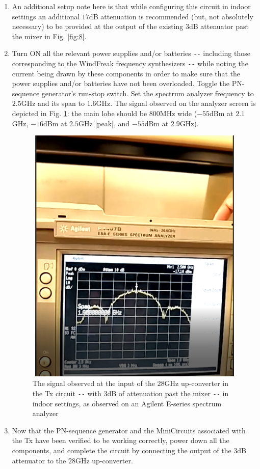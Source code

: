 \documentclass[12pt, draftcls, onecolumn]{IEEEtran}
\begin{document}
\begin{enumerate}
    \item An additional setup note here is that while configuring this circuit in indoor settings an additional $17$dB attenuation is recommended (but, not absolutely necessary) to be provided at the output of the existing $3$dB attenuator past the mixer in Fig. \ref{fig:8}.
    \item Turn ON all the relevant power supplies and/or batteries \texttt{-{}-} including those corresponding to the WindFreak frequency synthesizers \texttt{-{}-} while noting the current being drawn by these components in order to make sure that the power supplies and/or batteries have not been overloaded. Toggle the PN-sequence generator's run-stop switch. Set the spectrum analyzer frequency to $2.5$GHz and its span to $1.6$GHz. The signal observed on the analyzer screen is depicted in Fig. \ref{fig:9}: the main lobe should be $800$MHz wide ($-55$dBm at $2.1$GHz, $-16$dBm at $2.5$GHz [peak], and $-55$dBm at $2.9$GHz).
    \begin{figure}
        \centering
        \includegraphics[width=15cm, height=12.5cm]{5.png}
        \caption{The signal observed at the input of the $28$GHz up-converter in the Tx circuit \texttt{-{}-} with $3$dB of attenuation past the mixer \texttt{-{}-} in indoor settings, as observed on an Agilent E-series spectrum analyzer}
        \label{fig:9}
    \end{figure}
    \item Now that the PN-sequence generator and the MiniCircuits associated with the Tx have been verified to be working correctly, power down all the components, and complete the circuit by connecting the output of the $3$dB attenuator to the $28$GHz up-converter.

\end{enumerate}
\end{document}
